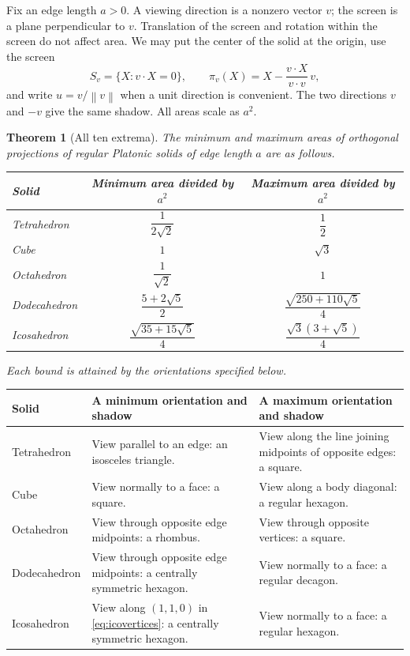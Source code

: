 \documentclass[11pt,a4paper]{article}
\newtheorem{theorem}{Theorem}[section]
\newcommand{\norm}[1]{\left\lVert#1\right\rVert}
\begin{document}
Fix an edge length $a>0$. A viewing direction is a nonzero vector $v$; the screen is a plane perpendicular to $v$. Translation of the screen and rotation within the screen do not affect area. We may put the center of the solid at the origin, use the screen
\[
 S_v=\{X:v\cdot X=0\},\qquad
 \pi_v(X)=X-\frac{v\cdot X}{v\cdot v}\,v,
\]
and write $u=v/\norm v$ when a unit direction is convenient. The two directions $v$ and $-v$ give the same shadow. All areas scale as $a^2$.

\begin{theorem}[All ten extrema]\label{thm:answers}
The minimum and maximum areas of orthogonal projections of regular Platonic solids of edge length $a$ are as follows.
\begin{center}
\renewcommand{\arraystretch}{1.65}
\begin{tabular}{@{}lcc@{}}
\toprule
Solid & Minimum area divided by $a^2$ & Maximum area divided by $a^2$\\
\midrule
Tetrahedron & $\dfrac1{2\sqrt2}$ & $\dfrac12$\\
Cube & $1$ & $\sqrt3$\\
Octahedron & $\dfrac1{\sqrt2}$ & $1$\\
Dodecahedron & $\dfrac{5+2\sqrt5}{2}$ & $\dfrac{\sqrt{250+110\sqrt5}}4$\\
Icosahedron & $\dfrac{\sqrt{35+15\sqrt5}}4$ & $\dfrac{\sqrt3(3+\sqrt5)}4$\\
\bottomrule
\end{tabular}
\end{center}
Each bound is attained by the orientations specified below.
\end{theorem}

\begin{center}
\small\renewcommand{\arraystretch}{1.35}
\begin{tabular}{@{}lp{58mm}p{58mm}@{}}
\toprule
Solid & A minimum orientation and shadow & A maximum orientation and shadow\\
\midrule
Tetrahedron & View parallel to an edge: an isosceles triangle. & View along the line joining midpoints of opposite edges: a square.\\
Cube & View normally to a face: a square. & View along a body diagonal: a regular hexagon.\\
Octahedron & View through opposite edge midpoints: a rhombus. & View through opposite vertices: a square.\\
Dodecahedron & View through opposite edge midpoints: a centrally symmetric hexagon. & View normally to a face: a regular decagon.\\
Icosahedron & View along $(1,1,0)$ in \eqref{eq:icovertices}: a centrally symmetric hexagon. & View normally to a face: a regular hexagon.\\
\bottomrule
\end{tabular}
\end{center}
\end{document}

